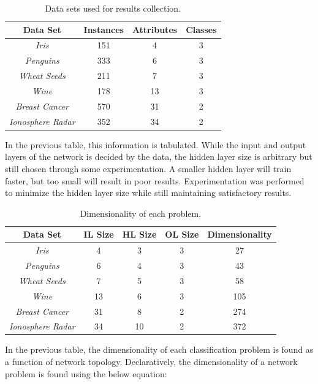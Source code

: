 \documentclass[a4paper,12pt]{article}
\begin{document}
\begin{table}[h!]
\centering
\begin{tabular}{|c|c|c|c|}
\hline
\textbf{Data Set} & \textbf{Instances} & \textbf{Attributes} & \textbf{Classes} \\ \hline
\textit{Iris} & 151 & 4 & 3 \\ \hline
\textit{Penguins} & 333 & 6 & 3 \\ \hline
\textit{Wheat Seeds} & 211 & 7 & 3 \\ \hline
\textit{Wine} & 178 & 13 & 3 \\ \hline
\textit{Breast Cancer} & 570 & 31 & 2 \\ \hline
\textit{Ionosphere Radar} & 352 & 34 & 2 \\ \hline
\end{tabular}
\caption{Data sets used for results collection.}
\label{Tab:data-sets}
\end{table}

In the previous table, this information is tabulated. While the input and output layers of the network is decided by the data, the hidden layer size is arbitrary but still chosen through some experimentation. A smaller hidden layer will train faster, but too small will result in poor results. Experimentation was performed to minimize the hidden layer size while still maintaining satisfactory results.

\begin{table}[h!]
\centering
\begin{tabular}{|c|c|c|c|c|}
\hline
\textbf{Data Set} & \textbf{IL Size} & \textbf{HL Size} & \textbf{OL Size} & \textbf{Dimensionality} \\ \hline
\textit{Iris} & 4 & 3 & 3 & 27 \\ \hline
\textit{Penguins} & 6 & 4 & 3 & 43 \\ \hline
\textit{Wheat Seeds} & 7 & 5 & 3 & 58 \\ \hline
\textit{Wine} & 13 & 6 & 3 & 105 \\ \hline
\textit{Breast Cancer} & 31 & 8 & 2 & 274 \\ \hline
\textit{Ionosphere Radar} & 34 & 10 & 2 & 372 \\ \hline
\end{tabular}
\caption{Dimensionality of each problem.}
\label{Tab:dim-tab}
\end{table}

In the previous table, the dimensionality of each classification problem is found as a function of network topology. Declaratively, the dimensionality of a network problem is found using the below equation:
\end{document}
